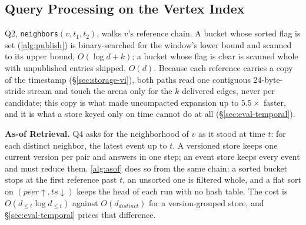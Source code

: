 \documentclass[sigconf,nonacm]{acmart}
\begin{document}
\subsection{Query Processing on the Vertex Index}\label{sec:query-expand}
Q2, \texttt{neighbors}$(v, t_1, t_2)$, walks $v$'s reference chain.
A bucket whose sorted flag is set (\cref{alg:publish}) is
binary-searched for the window's lower bound and scanned to its upper
bound, $O(\log d + k)$; a bucket whose flag is clear is scanned whole
with unpublished entries skipped, $O(d)$. Because each reference
carries a copy of the timestamp (\S\ref{sec:storage-vi}), both paths
read one contiguous 24-byte-stride stream and touch the arena only for
the $k$ delivered edges, never per candidate; this copy is what made
uncompacted expansion up to $5.5\times$ faster, and it is what a store
keyed only on time cannot do at all (\S\ref{sec:eval-temporal}).

\textbf{As-of Retrieval.} Q4 asks for the neighborhood of $v$ as it
stood at time $t$: for each distinct neighbor, the latest event up to
$t$. A versioned store keeps one current version per pair and answers
in one step; an event store keeps every event and must reduce them.
\cref{alg:asof} does so from the same chain: a sorted bucket stops at
the first reference past $t$, an unsorted one is filtered whole, and a
flat sort on $(peer \uparrow, ts \downarrow)$ keeps the head of each
run with no hash table. The cost is $O(d_{\le t}\log d_{\le t})$
against $O(d_{\mathit{distinct}})$ for a version-grouped store, and
\S\ref{sec:eval-temporal} prices that difference.

\begin{algorithm}[t]
\small
\DontPrintSemicolon
{}
\caption{\small As-of retrieval (Q4).}
\label{alg:asof}
\end{algorithm}
\end{document}
